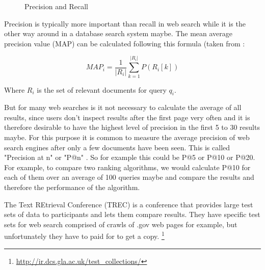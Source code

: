 \def\leftcircle{(0,0) circle (1.5cm)}
\def\rightcircle{(0:2cm) circle (1.5cm)}

\begin{figure}
  \centering
\caption[Precision and Recall]{Precision and Recall}
\label{fig:PR}
\end{figure}

Precision is typically more important than recall in web search while it is the other way around in a database search system maybe. The mean average precision value (MAP) can be calculated following this formula (taken from \citep[p.141]{Baeza-Yates2011}:

\begin{equation}
  MAP_i = \frac{1}{|R_i|} \sum_{k=1}^{|R_i|} P(R_i[k])
\end{equation}

Where $R_i$ is the set of relevant documents for query $q_i$.

But for many web searches is it not necessary to calculate the average of all results, since users don't inspect results after the first page very often and it is therefore desirable to have the highest level of precision in the first 5 to 30 results maybe. For this purpose it is common to measure the average precision of web search engines after only a few documents have been seen. This is called "Precision at n" or "P@n" \citep[p.140]{Baeza-Yates2011}. So for example this could be P@5 or P@10 or P@20. For example, to compare two ranking algorithms, we would calculate P@10 for each of them over an average of 100 queries maybe and compare the results and therefore the performance of the algorithm.

The Text REtrieval Conference (TREC) is a conference that provides large test sets of data to participants and lets them compare results. They have specific test sets for web search comprised of crawls of .gov web pages for example, but unfortunately they have to paid for to get a copy. \footnote{\url{http://ir.dcs.gla.ac.uk/test_collections/}}

